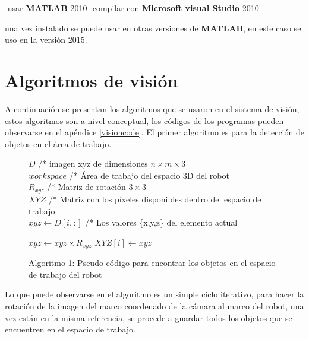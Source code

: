     -usar \textbf{MATLAB} 2010
    -compilar con \textbf{Microsoft visual Studio} 2010
    
    
    una vez instalado se puede usar en otras versiones de \textbf{MATLAB}, en este caso se uso en la versión 2015.
    
    
    
    
    
    
    
    
    
    
    
    
    
    
    
    
    
    
    
    
    
    
    
    
    
    
    
    
    
    \section{Algoritmos de visión}
    A continuación se presentan los algoritmos que se usaron en el sistema de visión, estos algoritmos son a nivel conceptual, los códigos de los programas pueden observarse en el apéndice \ref{visioncode}. El primer algoritmo es para la detección de objetos en el área de trabajo.
    \begin{figure}[h]
    	\centering
    	\begin{algorithmic}
    		\REQUIRE $ D $ /* imagen xyz de dimensiones $n \times m \times 3$ \\
    		
    		
    			\REQUIRE $ workspace $ /* Área de trabajo del espacio 3D del robot \\
    			
    			
    			\REQUIRE $ R_{xyz} $ /* Matriz de rotación $3\times 3$ \\
    			
    			
    			\ENSURE $XYZ$ /* Matriz con los píxeles disponibles dentro del espacio de trabajo\\
    		\STATE $xyz \leftarrow  D[i,:]$ /* Los valores \{x,y,z\} del elemento actual
    		
    		\STATE $xyz \leftarrow xyz \times R_{xyz}$
    		\STATE $XYZ[i] \leftarrow xyz$
    		\ENDIF
    		\ENDFOR
    	\end{algorithmic}
    	\caption{Algoritmo 1: Pseudo-código para encontrar los objetos en el espacio de trabajo del robot}
    	\label{alg1}
    \end{figure} 
    Lo que puede observarse en el algoritmo es un simple ciclo iterativo, para hacer la rotación de la imagen del marco coordenado de la cámara al marco del robot, una vez están en la misma referencia, se procede a guardar todos los objetos que se encuentren en el espacio de trabajo.
    
